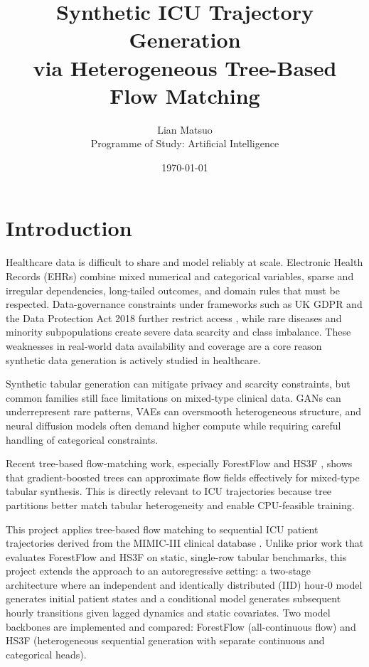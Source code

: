 \documentclass[11pt]{informatics-report}
\title{Synthetic ICU Trajectory Generation\\\vspace{0.2cm}via Heterogeneous Tree-Based Flow Matching}
\author{Lian Matsuo\\Programme of Study: Artificial Intelligence}
\date{\today}
\begin{document}
\setlength{\emergencystretch}{3em}
\createFrontMatter
\onehalfspacing
\tableofcontents
\doublespacing


\chapter{Introduction}

Healthcare data is difficult to share and model reliably at scale. Electronic Health Records (EHRs) combine mixed numerical and categorical variables, sparse and irregular dependencies, long-tailed outcomes, and domain rules that must be respected. Data-governance constraints under frameworks such as UK GDPR and the Data Protection Act 2018 further restrict access \cite{dataProtectionAct2018,icoResearchSafeguards}, while rare diseases and minority subpopulations create severe data scarcity and class imbalance. These weaknesses in real-world data availability and coverage are a core reason synthetic data generation is actively studied in healthcare.

Synthetic tabular generation can mitigate privacy and scarcity constraints, but common families still face limitations on mixed-type clinical data. GANs can underrepresent rare patterns, VAEs can oversmooth heterogeneous structure, and neural diffusion models often demand higher compute while requiring careful handling of categorical constraints.

Recent tree-based flow-matching work, especially ForestFlow \cite{jolicoeur2023forest} and HS3F \cite{akazan2024hs3f}, shows that gradient-boosted trees can approximate flow fields effectively for mixed-type tabular synthesis. This is directly relevant to ICU trajectories because tree partitions better match tabular heterogeneity and enable CPU-feasible training.

This project applies tree-based flow matching to sequential ICU patient trajectories derived from the MIMIC-III clinical database \cite{johnson2016mimic}. Unlike prior work that evaluates ForestFlow and HS3F on static, single-row tabular benchmarks, this project extends the approach to an autoregressive setting: a two-stage architecture where an independent and identically distributed (IID) hour-0 model generates initial patient states and a conditional model generates subsequent hourly transitions given lagged dynamics and static covariates. Two model backbones are implemented and compared: ForestFlow (all-continuous flow) and HS3F (heterogeneous sequential generation with separate continuous and categorical heads).
\end{document}
